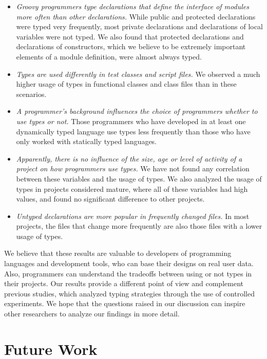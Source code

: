 \documentclass[msc]{ppgccufmg}
\begin{document}
\begin{itemize}
	\item \emph{Groovy programmers type declarations that define the interface of modules more often than other declarations.} 
While public and protected declarations were typed very frequently, most private declarations and declarations of local variables were not typed. We also found that protected declarations and declarations of constructors, which we believe to be extremely important elements of a module definition, were almost always typed.

	\item \emph{Types are used differently in test classes and script files.}  We observed a much higher usage of types in functional classes and class files than in these scenarios.

	\item \emph{A programmer's background influences the choice of programmers whether to use types or not.} Those programmers who have developed in at least one dynamically typed language use types less frequently than those who have only worked with statically typed languages.
	
	\item \emph{Apparently, there is no influence of the size, age or level of activity of a project on how programmers use types.} We have not found any correlation between these variables and the usage of types. We also analyzed the usage of types in projects considered mature, where all of these variables had high values, and found no significant difference to other projects.

	\item \emph{Untyped declarations are more popular in frequently changed files.} In most projects, the files that change more frequently are also those files with a lower usage of types.
\end{itemize}

We believe that these results are valuable to developers of programming languages and development tools, who can base their designs on real user data.
Also, programmers can understand the tradeoffs between using or not types in their projects.
Our results provide a different point of view and complement previous studies, which analyzed typing strategies through the use of controlled experiments. 
We hope that the questions raised in our discussion can inspire other researchers to analyze our findings in more detail.

\section{Future Work\label{sec:future}}
\end{document}

